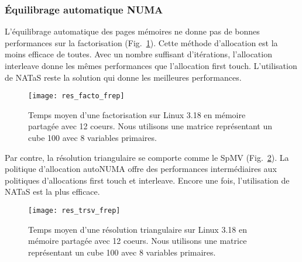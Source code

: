 \subsubsection{\'Equilibrage automatique NUMA}
L'équilibrage automatique des pages mémoires ne donne pas de bonnes performances sur la factorisation (Fig.~\ref{fig:res_facto_frep}).
%
Cette méthode d'allocation est la moins efficace de toutes.
%
Avec un nombre suffisant d'itérations, l'allocation interleave donne les mêmes performances que l'allocation first touch.
%
L'utilisation de NATaS reste la solution qui donne les meilleures performances.

\begin{figure}
  \centering
  \texttt{[image: res\_facto\_frep]}
  \caption{Temps moyen d'une factorisation sur Linux 3.18 en mémoire partagée avec 12 coeurs. Nous utilisons une matrice représentant un cube 100 avec 8 variables primaires.}
  \label{fig:res_facto_frep}
\end{figure}
Par contre, la résolution triangulaire se comporte comme le SpMV (Fig.~\ref{fig:res_trsv_frep}).
%
La politique d'allocation autoNUMA offre des performances intermédiaires aux politiques d'allocations first touch et interleave.
%
Encore une fois, l'utilisation de NATaS est la plus efficace.

\begin{figure}
  \centering
  \texttt{[image: res\_trsv\_frep]}
  \caption{Temps moyen d'une résolution triangulaire sur Linux 3.18 en mémoire partagée avec 12 coeurs. Nous utilisons une matrice représentant un cube 100 avec 8 variables primaires.}
  \label{fig:res_trsv_frep}
\end{figure}
